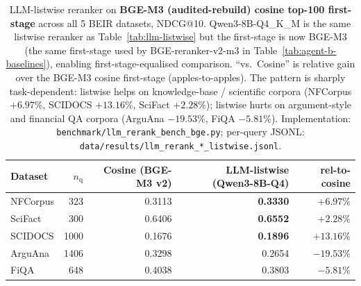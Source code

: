 \begin{table}[ht]
\centering
\caption{LLM-listwise reranker on \textbf{BGE-M3 (audited-rebuild) cosine top-100 first-stage} across all 5 BEIR datasets, NDCG@10. Qwen3-8B-Q4\_K\_M is the same listwise reranker as Table~\ref{tab:llm-listwise} but the first-stage is now BGE-M3 (the same first-stage used by BGE-reranker-v2-m3 in Table~\ref{tab:agent-b-baselines}), enabling first-stage-equalised comparison. ``vs.\ Cosine'' is relative gain over the BGE-M3 cosine first-stage (apples-to-apples). The pattern is sharply task-dependent: listwise helps on knowledge-base / scientific corpora (NFCorpus $+6.97\%$, SCIDOCS $+13.16\%$, SciFact $+2.28\%$); listwise hurts on argument-style and financial QA corpora (ArguAna $-19.53\%$, FiQA $-5.81\%$). Implementation: \texttt{benchmark/llm\_rerank\_bench\_bge.py}; per-query JSONL: \texttt{data/results/llm\_rerank\_*\_listwise.jsonl}.}
\label{tab:llm-listwise-bgem3}
\footnotesize
\begin{tabular}{lrrrr}
\toprule
Dataset & $n_{\mathrm{q}}$ & Cosine (BGE-M3 v2) & LLM-listwise (Qwen3-8B-Q4) & rel-to-cosine \\
\midrule
NFCorpus  &  323 & 0.3113 & \textbf{0.3330} & $+6.97\%$ \\
SciFact   &  300 & 0.6406 & \textbf{0.6552} & $+2.28\%$ \\
SCIDOCS   & 1000 & 0.1676 & \textbf{0.1896} & $+13.16\%$ \\
ArguAna   & 1406 & 0.3298 &        0.2654   & $-19.53\%$ \\
FiQA      &  648 & 0.4038 &        0.3803   & $-5.81\%$  \\
\bottomrule
\end{tabular}
\end{table}



